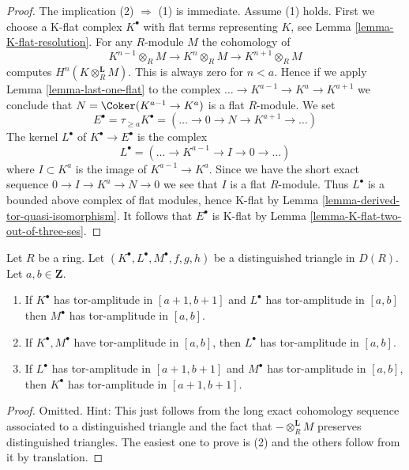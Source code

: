 \begin{proof}
The implication (2) $\Rightarrow$ (1) is immediate. Assume (1) holds.
First we choose a K-flat complex $K^\bullet$ with flat terms representing
$K$, see Lemma \ref{lemma-K-flat-resolution}.
For any $R$-module $M$ the cohomology of
$$
K^{n - 1} \otimes_R M \to K^n \otimes_R M \to K^{n + 1} \otimes_R M
$$
computes $H^n(K \otimes_R^\mathbf{L} M)$. This is always zero
for $n < a$. Hence if we apply Lemma \ref{lemma-last-one-flat}
to the complex $\ldots \to K^{a - 1} \to K^a \to K^{a + 1}$
we conclude that $N = \Coker(K^{a - 1} \to K^a)$ is a flat $R$-module.
We set
$$
E^\bullet = \tau_{\geq a}K^\bullet =
(\ldots \to 0 \to N \to K^{a + 1} \to \ldots )
$$
The kernel $L^\bullet$ of $K^\bullet \to E^\bullet$ is the complex
$$
L^\bullet = (\ldots \to K^{a - 1} \to I \to 0 \to \ldots)
$$
where $I \subset K^a$ is the image of $K^{a - 1} \to K^a$.
Since we have the short exact sequence $0 \to I \to K^a \to N \to 0$
we see that $I$ is a flat $R$-module. Thus $L^\bullet$ is a bounded
above complex of flat modules, hence K-flat by
Lemma \ref{lemma-derived-tor-quasi-isomorphism}.
It follows that $E^\bullet$ is K-flat by
Lemma \ref{lemma-K-flat-two-out-of-three-ses}.
\end{proof}

\begin{lemma}
\label{lemma-cone-tor-amplitude}
Let $R$ be a ring.
Let $(K^\bullet, L^\bullet, M^\bullet, f, g, h)$ be a distinguished
triangle in $D(R)$. Let $a, b \in \mathbf{Z}$.
\begin{enumerate}
\item If $K^\bullet$ has tor-amplitude in $[a + 1, b + 1]$ and
$L^\bullet$ has tor-amplitude in $[a, b]$ then $M^\bullet$ has
tor-amplitude in $[a, b]$.
\item If $K^\bullet, M^\bullet$ have tor-amplitude in $[a, b]$, then
$L^\bullet$ has tor-amplitude in $[a, b]$.
\item If $L^\bullet$ has tor-amplitude in $[a + 1, b + 1]$
and $M^\bullet$ has tor-amplitude in $[a, b]$, then
$K^\bullet$ has tor-amplitude in $[a + 1, b + 1]$.
\end{enumerate}
\end{lemma}

\begin{proof}
Omitted. Hint: This just follows from the long exact cohomology sequence
associated to a distinguished triangle and the fact that
$- \otimes_R^{\mathbf{L}} M$ preserves distinguished triangles.
The easiest one to prove is (2) and the others follow from it by
translation.
\end{proof}

